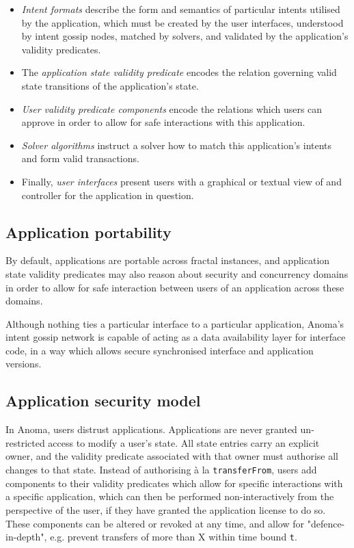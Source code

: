 \documentclass[
    9pt,            %
    commun,        %
    affiltop,       %
]{art}
\begin{document}
\begin{itemize}
\item
  \emph{Intent formats} describe the form and semantics of particular
  intents utilised by the application, which must be created by the user
  interfaces, understood by intent gossip nodes, matched by solvers, and
  validated by the application's validity predicates.
\item
  The \emph{application state validity predicate} encodes the relation
  governing valid state transitions of the application's
  state.
\item
  \emph{User validity predicate components} encode the relations which
  users can approve in order to allow for safe interactions with this
  application.
\item
  \emph{Solver algorithms} instruct a solver how to match this
  application's intents and form valid transactions.
\item
  Finally, \emph{user interfaces} present users with a graphical or
  textual view of and controller for the application in question.
\end{itemize}

\subsection{Application portability}\label{application-portability}

By default, applications are portable across fractal instances, and
application state validity predicates may also reason about security and
concurrency domains in order to allow for safe interaction between users
of an application across these domains.

Although nothing ties a particular interface to a particular
application, Anoma's intent gossip network is capable of
acting as a data availability layer for interface code, in a way which
allows secure synchronised interface and application versions.

\subsection{Application security model}\label{application-security-model}

In Anoma, users distrust applications. Applications are never granted
un-restricted access to modify a user's state. All state
entries carry an explicit owner, and the validity predicate associated
with that owner must authorise all changes to that state. Instead of
authorising à la \texttt{transferFrom}, users add components to their
validity predicates which allow for specific interactions with a
specific application, which can then be performed non-interactively from
the perspective of the user, if they have granted the application
license to do so. These components can be altered or revoked at any
time, and allow for "defence-in-depth", e.g. prevent transfers of more
than X within time bound \texttt{t}.
\end{document}
